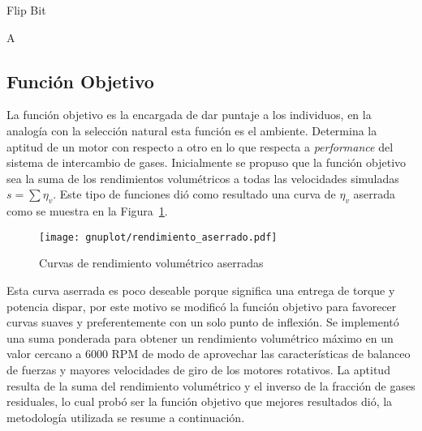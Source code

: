 \begin{algorithm}
  \caption{Flip Bit}\label{algo:flipbit}
  \DontPrintSemicolon

    \Return A\;
\end{algorithm}

\subsection{Función Objetivo}\label{sec:funcion_objetivo}
%
La función objetivo es la encargada de dar puntaje a los individuos, en la
analogía con la selección natural esta función es el ambiente.
%
Determina la aptitud de un motor con respecto a otro en lo que respecta a
\emph{performance} del sistema de intercambio de gases.
%
Inicialmente se propuso que la función objetivo sea la suma de los rendimientos
volumétricos a todas las velocidades simuladas $s=\sum \eta_{v}$.
%
Este tipo de funciones dió como resultado una curva de $\eta_{v}$ aserrada como
se muestra en la Figura~\ref{fig:curva_aserrada}.

\begin{figure}[ht]
  \centering
  \texttt{[image: gnuplot/rendimiento\_aserrado.pdf]}
  \caption{Curvas de rendimiento volumétrico aserradas}\label{fig:curva_aserrada}
\end{figure}

Esta curva aserrada es poco deseable porque significa una entrega de torque y
potencia dispar, por este motivo se modificó la función objetivo para favorecer
curvas suaves y preferentemente con un solo punto de inflexión.
%
Se implementó una suma ponderada para obtener un rendimiento volumétrico máximo
en un valor cercano a 6000 RPM de modo de aprovechar las características de
balanceo de fuerzas y mayores velocidades de giro de los motores rotativos.
%
La aptitud resulta de la suma del rendimiento volumétrico y el inverso de la
fracción de gases residuales, lo cual probó ser la función objetivo que mejores
resultados dió, la metodología utilizada se resume a continuación.

